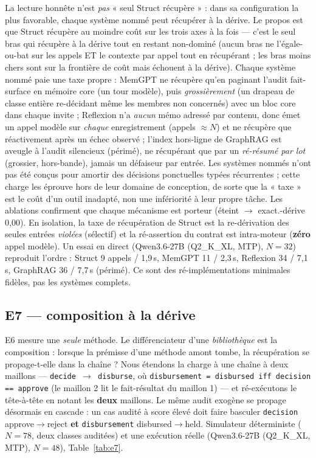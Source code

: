 \documentclass[11pt]{article}
\begin{document}
La lecture honnête n'est \emph{pas} « seul Struct récupère » : dans sa configuration la plus favorable, chaque
système nommé peut récupérer à la dérive. Le propos est que Struct récupère au moindre coût sur les trois axes à la
fois --- c'est le seul bras qui récupère à la dérive tout en restant non-dominé (aucun bras ne l'égale-ou-bat sur
les appels ET le contexte par appel tout en récupérant ; les bras moins chers sont sur la frontière de coût mais
échouent à la dérive). Chaque système nommé paie une taxe propre : MemGPT ne
récupère qu'en paginant l'audit fait-surface en mémoire core (un tour modèle), puis \emph{grossièrement} (un
drapeau de classe entière re-décidant même les membres non concernés) avec un bloc core dans chaque invite ;
Reflexion n'a \emph{aucun} mémo adressé par contenu, donc émet un appel modèle sur \emph{chaque} enregistrement
(appels $\approx N$) et ne récupère que réactivement après un échec observé ; l'index hors-ligne de GraphRAG est
aveugle à l'audit silencieux (périmé), ne récupérant que par un \emph{ré-résumé par lot} (grossier, hors-bande),
jamais un défaiseur par entrée. Les systèmes nommés n'ont pas été conçus pour amortir des décisions ponctuelles
typées récurrentes ; cette charge les éprouve hors de leur domaine de conception, de sorte que la « taxe » est le
coût d'un outil inadapté, non une infériorité à leur propre tâche. Les ablations confirment que chaque mécanisme
est porteur (éteint $\to$ exact.-dérive 0,00). En isolation, la taxe de récupération de Struct est la re-dérivation
des seules entrées \emph{violées} (sélectif) et la ré-assertion du contrat est intra-moteur (\textbf{zéro} appel
modèle). Un essai en direct (Qwen3.6-27B (Q2\_K\_XL, MTP), $N=32$) reproduit l'ordre : Struct 9 appels / 1,9\,s,
MemGPT 11 / 2,3\,s, Reflexion 34 / 7,1\,s, GraphRAG 36 / 7,7\,s (périmé). Ce sont des ré-implémentations minimales
fidèles, pas les systèmes complets.

\subsection{E7 --- composition à la dérive}
E6 mesure une \emph{seule} méthode. Le différenciateur d'une \emph{bibliothèque} est la composition : lorsque la
prémisse d'une méthode amont tombe, la récupération se propage-t-elle dans la chaîne ? Nous étendons la charge à une
chaîne à deux maillons --- \texttt{decide $\to$ disburse}, où \texttt{disbursement = disbursed iff decision ==
approve} (le maillon 2 lit le fait-résultat du maillon 1) --- et ré-exécutons le tête-à-tête en notant les
\textbf{deux} maillons. Le même audit exogène se propage désormais en cascade : un cas audité à score élevé doit
faire basculer \texttt{decision} approve$\to$reject \textbf{et} \texttt{disbursement} disbursed$\to$held.
Simulateur déterministe ($N{=}78$, deux classes auditées) et une exécution réelle (Qwen3.6-27B (Q2\_K\_XL, MTP),
$N{=}48$), Table~\ref{tab:e7}.
\end{document}
